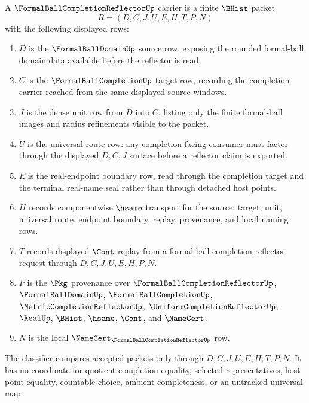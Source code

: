 \begin{definition}\label{def:formal-ball-completion-reflector-carrier}
A $\FormalBallCompletionReflectorUp$ carrier is a finite $\BHist$ packet
$$
R=(D,C,J,U,E,H,T,P,N)
$$
with the following displayed rows:
\begin{enumerate}
\item $D$ is the $\FormalBallDomainUp$ source row, exposing the rounded formal-ball domain data available before the reflector is read.
\item $C$ is the $\FormalBallCompletionUp$ target row, recording the completion carrier reached from the same displayed source windows.
\item $J$ is the dense unit row from $D$ into $C$, listing only the finite formal-ball images and radius refinements visible to the packet.
\item $U$ is the universal-route row: any completion-facing consumer must factor through the displayed $D,C,J$ surface before a reflector claim is exported.
\item $E$ is the real-endpoint boundary row, read through the completion target and the terminal real-name seal rather than through detached host points.
\item $H$ records componentwise $\hsame$ transport for the source, target, unit, universal route, endpoint boundary, replay, provenance, and local naming rows.
\item $T$ records displayed $\Cont$ replay from a formal-ball completion-reflector request through $D,C,J,U,E,H,P,N$.
\item $P$ is the $\Pkg$ provenance over $\FormalBallCompletionReflectorUp$, $\FormalBallDomainUp$, $\FormalBallCompletionUp$, $\MetricCompletionReflectorUp$, $\UniformCompletionReflectorUp$, $\RealUp$, $\BHist$, $\hsame$, $\Cont$, and $\NameCert$.
\item $N$ is the local $\NameCert_{\FormalBallCompletionReflectorUp}$ row.
\end{enumerate}
The classifier compares accepted packets only through $D,C,J,U,E,H,T,P,N$. It has no coordinate for quotient completion equality, selected representatives, host point equality, countable choice, ambient completeness, or an untracked universal map.
\end{definition}

